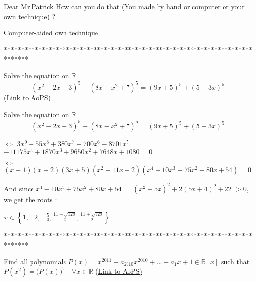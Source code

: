 \begin{solution}
	\begin{tcolorbox}Dear Mr.Patrick
How can you do that  (You made by hand or computer or your own technique)  ?\end{tcolorbox}
Computer-aided own technique
\end{solution}
*******************************************************************************
-------------------------------------------------------------------------------

\begin{problem}
	Solve the equation on $\mathbb R$ 
\[(x^2-2x+3)^5+(8x-x^2+7)^5=(9x+5)^5+(5-3x)^5\]
	\flushright \href{https://artofproblemsolving.com/community/c6h568171}{(Link to AoPS)}
\end{problem}



\begin{solution}
	\begin{tcolorbox}Solve the equation on $\mathbb R$ 
\[(x^2-2x+3)^5+(8x-x^2+7)^5=(9x+5)^5+(5-3x)^5\]\end{tcolorbox}
$\iff$ $3x^9-55x^8+380x^7-700x^6-8701x^5$ $-11175x^4+1870x^3+9650x^2+7648x+1080=0$

$\iff$ $(x-1)(x+2)(3x+5)(x^2-11x-2)(x^4-10x^3+75x^2+80x+54)=0$

And since $x^4-10x^3+75x^2+80x+54$ $=(x^2-5x)^2+2(5x+4)^2+22$ $>0$, we get the roots :

$\boxed{x\in\left\{1,-2,-\frac 53,\frac{11-\sqrt{129}}2,\frac{11+\sqrt{129}}2\right\}}$
\end{solution}
*******************************************************************************
-------------------------------------------------------------------------------

\begin{problem}
	Find all polynomials $P(x) = x^{2011}  + a_{2010} x^{2010}  + ... + a_1 x + 1 \in \mathbb{R}[x] $ such that $P(x^2 ) = ({P(x))^2\quad \forall x \in \mathbb{R}}$
	\flushright \href{https://artofproblemsolving.com/community/c6h568379}{(Link to AoPS)}
\end{problem}



